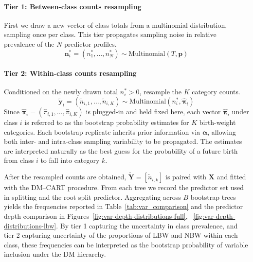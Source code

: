 \paragraph{Tier 1: Between-class counts resampling}
\label{para:tier-1}
First we draw a new vector of class totals from a multinomial distribution, sampling once per class. This tier propagates sampling noise in relative prevalence of the \(N\) predictor profiles.
\begin{equation}
    \label{eq:stage1}
    \mathbf{n}_i^\ast = (n_1^\ast, \dots, n_N^\ast) \sim \mathrm{Multinomial}(T, \mathbf{p})
    \end{equation}
\paragraph{Tier 2: Within-class counts resampling}
\label{para:tier-2}
Conditioned on the newly drawn total \(n_i^\ast > 0\), resample the \(K\) category counts. 
\begin{equation}
    \label{eq:stage2}
        \tilde{\mathbf{y}}_i = (\tilde{n}_{i,1}, \dots, \tilde{n}_{i,K}) \sim \mathrm{Multinomial}(n_i^\ast, \hat{\boldsymbol{\pi}}_i)
\end{equation}
Since \(\boldsymbol{\hat{\pi}}_i = (\hat{\pi}_{i,1}, \dots,\hat{\pi}_{i,K})\) is plugged-in and held fixed here, each vector \(\hat{\boldsymbol{\pi}}_i\) under class \(i\) is referred to as the bootstrap probability estimates for \(K\) birth-weight categories. Each bootstrap replicate inherits prior information via \(\boldsymbol{\alpha}\), allowing both inter- and intra-class sampling variability to be propagated. The estimates are interpreted naturally as the best guess for the probability of a future birth from class \(i\) to fall into category \(k\). 

After the resampled counts are obtained, \(\tilde{\mathbf Y} =[\tilde n_{i,k}]\) is paired with \(\mathbf{X}\) and fitted with the DM–CART procedure.  From each tree we record the predictor set used in splitting and the root split predictor. Aggregating across \(B\) bootstrap trees yields the frequencies reported in Table~\ref{tab:var_comparison} and the predictor depth comparison in Figures~\ref{fig:var-depth-distributions-full}, ~\ref{fig:var-depth-distributions-lbw}. By tier 1 capturing the uncertainty in class prevalence, and tier 2 capturing uncertainty of the proportions of LBW and NBW within each class, these frequencies can be interpreted as the bootstrap probability of variable inclusion under the DM hierarchy. 

